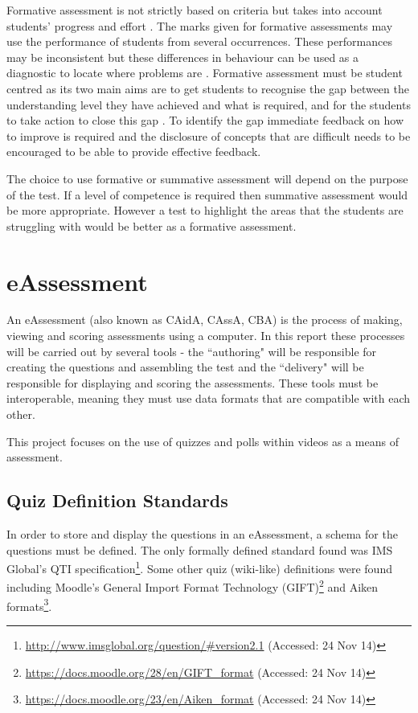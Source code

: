 Formative assessment is not strictly based on criteria but takes into account students' progress and effort \citep{assessmentTypes}. The marks given for formative assessments may use the performance of students from several occurrences. These performances may be inconsistent but these differences in behaviour can be used as a diagnostic to locate where problems are \citep{assessmentTypes}. Formative assessment must be student centred as its two main aims are to get students to recognise the gap between the understanding level they have achieved and what is required, and for the students to take action to close this gap \citep{usesOfAssessment}. To identify the gap immediate feedback on how to improve is required \citep{eps265979} and the disclosure of concepts that are difficult needs to be encouraged \citep{knight2001briefing} to be able to provide effective feedback. 

The choice to use formative or summative assessment will depend on the purpose of the test. If a level of competence is required then summative assessment would be more appropriate. However a test to highlight the areas that the students are struggling with would be better as a formative assessment.

\section{eAssessment}
An \gls{eAssessment} (also known as \gls{CAidA}, \gls{CAssA}, \gls{CBA}) is the process of making, viewing and scoring assessments using a computer. In this report these processes will be carried out by several tools - the ``\gls{authoring}" will be responsible for creating the questions and assembling the test and the ``\gls{delivery}" will be responsible for displaying and scoring the assessments. These tools must be interoperable, meaning they must use data formats that are compatible with each other.

This project focuses on the use of quizzes and polls within videos as a means of assessment.

\subsection{Quiz Definition Standards}
\label{Subsection:Quiz Definition Standards}
In order to store and display the questions in an \gls{eAssessment}, a schema for the questions must be defined. The only formally defined standard found was IMS Global's \gls{QTI} specification\footnote{\url{http://www.imsglobal.org/question/\#version2.1} (Accessed: 24 Nov 14)}. Some other quiz (wiki-like) definitions were found including Moodle's General Import Format Technology (GIFT)\footnote{\url{https://docs.moodle.org/28/en/GIFT_format} (Accessed: 24 Nov 14)} and Aiken formats\footnote{\url{https://docs.moodle.org/23/en/Aiken_format} (Accessed: 24 Nov 14)}.

